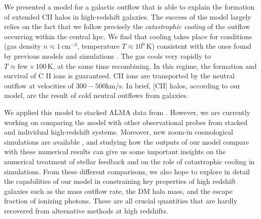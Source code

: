 \documentclass[12pt]{article}
\begin{document}
We presented a model \citep{Pizzati20} for a galactic outflow that is able to explain the formation of extended CII halos in high-redshift galaxies. The success of the model largely relies on the fact that we follow precisely the \textit{catastrophic cooling} of the outflow occurring within the central kpc. We find that cooling takes place for conditions (gas density $n  \approx 1\,\mathrm{cm}^{-3}$, temperature $T \approx 10^6 \,\mathrm{K}$) consistent with the ones found by previous models and simulations \citep{Thompson16, Scannapieco:2017, gray2019catastrophic}. The gas cools very rapidly to $T \approx \mathrm{few} \times 100\,\mathrm{K}$, at the same time recombining. In this regime, the formation and survival of C II ions is guaranteed. CII ions are transported by the neutral outflow at velocities of $300-500 \mathrm{km/s}$. In brief, [CII] halos, according to our model, are the result of cold neutral outflows from galaxies.

We applied this model to stacked ALMA data from \citet{Fujimoto19}. However, we are currently working on comparing the model with other observational probes from stacked \citep{ginolfi:2019} and individual \citep{Fujimoto:2020qzo} high-redshift systems. Moreover, new zoom-in cosmological simulations are available \citep{pallottini:2019}, and studying how the outputs of our model compare with these numerical results can give us some important insights on the numerical treatment of stellar feedback and on the role of catastrophic cooling in simulations. From these different comparisons, we also hope to explore in detail the capabilities of our model in constraining key properties of high redshift galaxies such as the mass outflow rate, the DM halo mass, and the escape fraction of ionizing photons. These are all crucial quantities that are hardly recovered from alternative methods at high redshifts. 
\end{document}
